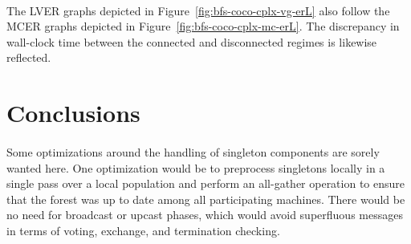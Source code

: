 \documentclass[11pt,epsf]{article}
\begin{document}
{{    \paragraph{}{
      The LVER graphs depicted in Figure~\ref{fig:bfs-coco-cplx-vg-erL} also follow the MCER graphs depicted in Figure~\ref{fig:bfs-coco-cplx-mc-erL}.
      The discrepancy in wall-clock time between the connected and disconnected regimes is likewise reflected.
    }
  }
}

\section{Conclusions}{
  \paragraph{}{
    Some optimizations around the handling of singleton components are sorely wanted here.
    One optimization would be to preprocess singletons locally in a single pass over a local
    population and perform an all-gather operation to ensure that the forest was up to date
    among all participating machines. There would be no need for broadcast or upcast phases,
    which would avoid superfluous messages in terms of voting, exchange, and termination checking.
  }
}

\printbibliography
\end{document}
